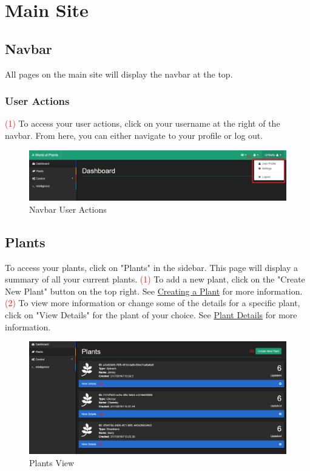 \documentclass{article}
\begin{document}
\section{Main Site}
	\subsection{Navbar}
	All pages on the main site will display the navbar at the top.
		\subsubsection{User Actions}
		\textcolor{red}{(1)} To access your user actions, click on your username at the right of the navbar. From here, you can either navigate to your profile or log out.
		\begin{figure}[H]
			\includegraphics[width=\textwidth]{../images/UserManual/navbar-user-actions.PNG}
			\caption{Navbar User Actions}
		\end{figure}
		
	\subsection{Plants}
	To access your plants, click on "Plants" in the sidebar. This page will display a summary of all your current plants.
	\newline
	\textcolor{red}{(1)} To add a new plant, click on the "Create New Plant" button on the top right. See \hyperref[sec:creating-a-plant]{Creating a Plant} for more information.
	\newline
	\textcolor{red}{(2)} To view more information or change some of the details for a specific plant, click on "View Details" for the plant of your choice. See \hyperref[sec:plant-details]{Plant Details} for more information.
	\begin{figure}[H]
		\includegraphics[width=\textwidth]{../images/UserManual/plants.PNG}
		\caption{Plants View}
	\end{figure}
		
\end{document}
